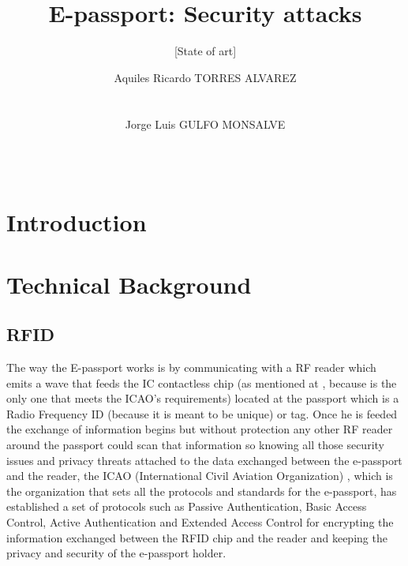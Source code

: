 \documentclass{acm_proc_article-sp}
\begin{document}
\title{E-passport: Security attacks}
\subtitle{[State of art]}

\author{
\alignauthor
Aquiles Ricardo TORRES ALVAREZ\\
       \\
       \\
\alignauthor
Jorge Luis GULFO MONSALVE\\
       \\
       \\
}

\maketitle
\begin{abstract}

\end{abstract}



\section{Introduction}

\section{Technical Background}

\subsection{RFID}
The way the E-passport works is by communicating with a RF reader which emits a wave that feeds the IC contactless chip (as mentioned at \cite{NM12}, because is the only one that meets the ICAO’s requirements) located at the passport which is a Radio Frequency ID (because it is meant to be unique) or tag. Once he is feeded the exchange of information begins but without protection any other RF reader around the passport could scan that information so knowing all those security issues and privacy threats attached to the data exchanged between the e-passport and the reader, the ICAO (International Civil Aviation Organization) , which is the organization that sets all the protocols and standards for the e-passport, has established a set of protocols such as Passive Authentication, Basic Access Control, Active Authentication and Extended Access Control for encrypting the information exchanged between the RFID chip and the reader and keeping the privacy and security of the e-passport holder.
\end{document}
